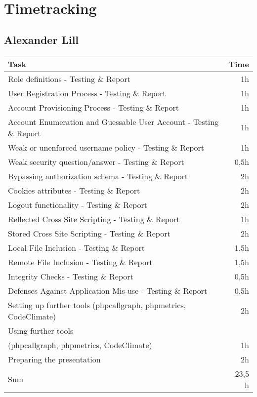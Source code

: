 \chapter{Timetracking}\label{chapter:timetracking}
\section*{Alexander Lill}
\begin{table}[h!tpb]
  \centering
  \begin{tabularx}{\textwidth}{X r}
    \toprule
      Task & Time \\
    \midrule
    Role definitions - Testing \& Report & 1h \\
    User Registration Process - Testing \& Report & 1h \\
    Account Provisioning Process - Testing \& Report & 1h \\
    Account Enumeration and Guessable User Account - Testing \& Report & 1h \\
    Weak or unenforced username policy - Testing \& Report & 1h \\
    Weak security question/answer - Testing \& Report & 0,5h \\
    Bypassing authorization schema - Testing \& Report & 2h \\
    Cookies attributes - Testing \& Report & 2h \\
    Logout functionality - Testing \& Report & 2h \\
    Reflected Cross Site Scripting - Testing \& Report & 1h \\
    Stored Cross Site Scripting - Testing \& Report & 2h \\
    Local File Inclusion - Testing \& Report & 1,5h \\
    Remote File Inclusion - Testing \& Report & 1,5h \\
    Integrity Checks - Testing \& Report & 0,5h \\
    Defenses Against Application Mis-use - Testing \& Report & 0,5h \\
    Setting up further tools (phpcallgraph, phpmetrics, CodeClimate) & 2h \\
    Using further tools\\(phpcallgraph, phpmetrics, CodeClimate) & 1h \\
    Preparing the presentation & 2h \\
    \midrule
      Sum & 23,5 h \\    
    \bottomrule
  \end{tabularx}
\end{table}


